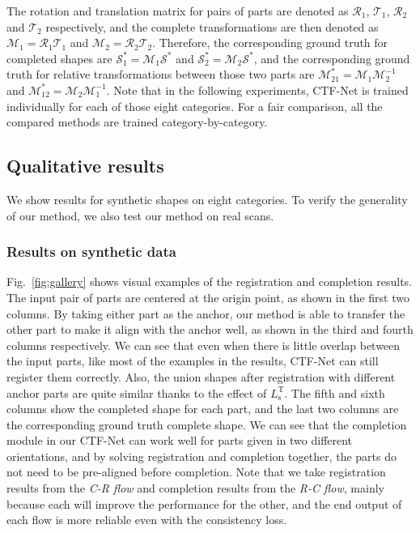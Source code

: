 The rotation and translation matrix for pairs of parts are denoted as $\mathcal{R}_{1}$, $\mathcal{T}_{1}$, $\mathcal{R}_{2}$ and $\mathcal{T}_{2}$ respectively, and the complete transformations are then denoted as $\mathcal{M}_{1} = \mathcal{R}_{1} \mathcal{T}_{1}$ and $\mathcal{M}_{2} = \mathcal{R}_{2} \mathcal{T}_{2}$. 
Therefore, the corresponding ground truth for completed shapes are $\mathcal{S}_{1}^* = \mathcal{M}_{1} \mathcal{S}^*$ and $\mathcal{S}_{2}^* = \mathcal{M}_{2} \mathcal{S}^*$,
and the corresponding ground truth for relative transformations between those two parts are $\mathcal{M}_{21}^{*} = \mathcal{M}_1\mathcal{M}_2^{-1}$ and $\mathcal{M}_{12}^{*} = \mathcal{M}_2\mathcal{M}_1^{-1}$.
Note that in the following experiments, CTF-Net is trained individually for each of those eight categories. For a fair comparison, all the compared methods are trained category-by-category.


\subsection{Qualitative results}

 \label{sec:qualitative}
We show results for synthetic shapes on eight categories. To verify the generality of our method, we also test our method on real scans.

\subsubsection{Results on synthetic data}

Fig.~\ref{fig:gallery} shows visual examples of the registration and  completion results. %
The input pair of parts are centered at the origin point, as shown in the first two columns.
By taking either part as the anchor, our method is able to transfer the other part to make it align with the anchor well, as shown in the third and fourth columns respectively. 
We can see that even when there is little overlap between the input parts, like most of the examples in the results, CTF-Net can still register them correctly. 
Also, the union shapes after registration with different anchor parts are quite similar thanks to the effect of $L_{\text{s}}^{\text{T}}$.
The fifth and sixth columns show the completed shape for each part, and the last two columns are the corresponding ground truth complete shape. 
We can see that the completion module in our CTF-Net can work well for parts given in two different orientations, and by solving registration and completion together, the parts do not need to be pre-aligned before completion.
Note that we take registration results from the \textit{C-R flow} and completion results from the \textit{R-C flow}, mainly because each will improve the performance for the other, and the end output of each flow is more reliable even with the consistency loss. 


